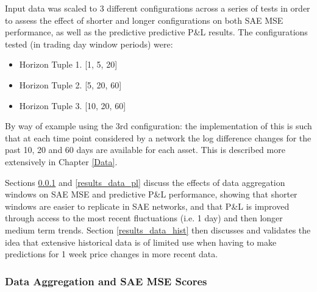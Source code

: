 \documentclass[a4paper,11pt,oneside]{article}
\theoremstyle{plain}
\theoremstyle{definition}
\begin{document}
Input data was scaled to 3 different configurations across a series of tests in order to assess the effect of shorter and longer configurations on both SAE MSE performance, as well as the predictive predictive P\&L results. The configurations tested (in trading day window periods) were:

\begin{itemize}
	\item[] Horizon Tuple 1. [1, 5, 20]
	\item[] Horizon Tuple 2. [5, 20, 60]
	\item[] Horizon Tuple 3. [10, 20, 60]
\end{itemize}

By way of example using the 3rd configuration: the implementation of this is such that at each time point considered by a network the log difference changes for the past 10, 20 and 60 days are available for each asset. This is described more extensively in Chapter \ref{Data}.\newline

Sections \ref{results_data_mse} and \ref{results_data_pl} discuss the effects of data aggregation windows on SAE MSE and predictive P\&L performance, showing that shorter windows are easier to replicate in SAE networks, and that P\&L is improved through access to the most recent fluctuations (i.e. 1 day) and then longer medium term trends. Section \ref{results_data_hist} then discusses and validates the idea that extensive historical data is of limited use when having to make predictions for 1 week price changes in more recent data.

\subsubsection{Data Aggregation and SAE MSE Scores}\label{results_data_mse}
\end{document}
